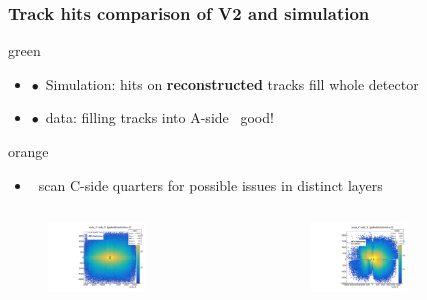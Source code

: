\documentclass[aspectratio=1610, 12pt, xcolor=dvipsnames]{beamer}
\begin{document}
\begin{frame}\frametitle{Track hits comparison of V2 and simulation}
\begin{mybox}{green}{}
  \begin{itemize}
    \item $\bullet$\, Simulation: hits on \textbf{reconstructed} tracks fill whole detector
    \item $\bullet$\, data: filling tracks into A-side \to\, good!
  \end{itemize}
\end{mybox}
\begin{mybox}{orange}{}
  \begin{itemize}
    \item \to\, scan C-side quarters for possible issues in distinct layers
  \end{itemize}
\end{mybox}
  \begin{columns}
    \begin{column}[c]{0.48\textwidth}
      \begin{figure}
        \centering
        \includegraphics[width=0.6\textwidth]{logos/nodeXY_MC.pdf}%
      \end{figure}
    \end{column}
    \begin{column}[c]{0.48\textwidth}
      \begin{figure}
        \centering
        \includegraphics[width=0.6\textwidth]{tuples_out/combining_2D_nodeXY_v2.pdf}%
      \end{figure}
    \end{column}
  \end{columns}
\end{frame}
\end{document}
